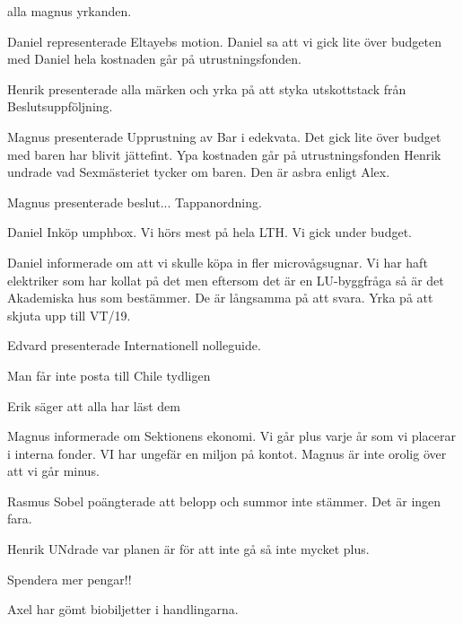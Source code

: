 \documentclass[10pt]{article}
\begin{document}
\begin{paragrafer}
\Mba alla magnus yrkanden.

Daniel representerade Eltayebs motion. Daniel sa att vi gick lite över budgeten med Daniel \ypa hela kostnaden går på utrustningsfonden.

\Mba

Henrik presenterade alla märken och yrka på att styka utskottstack från Beslutsuppföljning. 

\Mba

Magnus presenterade Upprustning av Bar i edekvata. Det gick lite över budget med baren har blivit jättefint. Ypa kostnaden går på utrustningsfonden
Henrik undrade vad Sexmästeriet tycker om baren.
Den är asbra enligt Alex.

\Mba

Magnus presenterade beslut... Tappanordning.

\Mba

Daniel Inköp umphbox. Vi hörs mest på hela LTH. Vi gick under budget. 

\Mba 

Daniel informerade om att vi skulle köpa in fler microvågsugnar. Vi har haft elektriker som har kollat på det men eftersom det är en LU-byggfråga så är det Akademiska hus som bestämmer. De är långsamma på att svara.
Yrka på att skjuta upp till VT/19.

\Mba

Edvard presenterade Internationell nolleguide. 

Man får inte posta till Chile tydligen

\Mba


Erik säger att alla har läst dem

\Mba 


\Mba


Magnus informerade om Sektionens ekonomi. Vi går plus varje år som vi placerar i interna fonder. VI har ungefär en miljon på kontot. 
Magnus är inte orolig över att vi går minus.

Rasmus Sobel poängterade att belopp och summor inte stämmer. Det är ingen fara. 

Henrik UNdrade var planen är för att inte gå så inte mycket plus. 

Spendera mer pengar!!

Axel har gömt biobiljetter i handlingarna.




\end{paragrafer}
\end{document}
